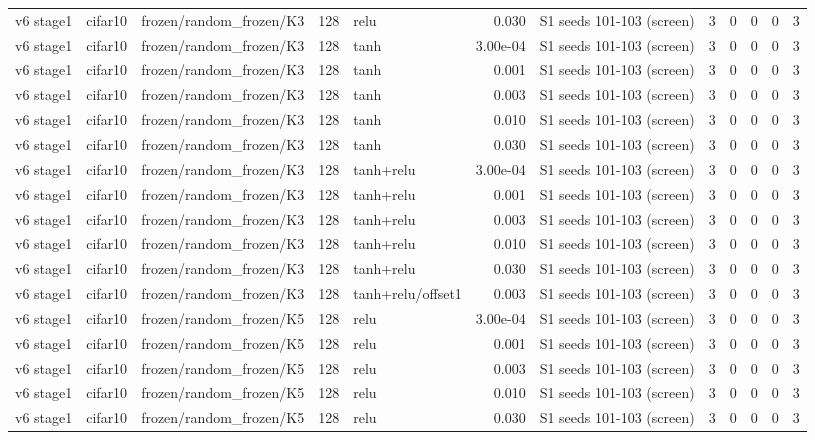 \begin{table}[htbp]
{\begin{tabular}{@{}lllrlrlrrrrr@{}}
v6 stage1 & cifar10 & frozen/random\_frozen/K3 & 128 & relu & 0.030 & S1 seeds 101-103 (screen) & 3 & 0 & 0 & 0 & 3 \\
v6 stage1 & cifar10 & frozen/random\_frozen/K3 & 128 & tanh & 3.00e-04 & S1 seeds 101-103 (screen) & 3 & 0 & 0 & 0 & 3 \\
v6 stage1 & cifar10 & frozen/random\_frozen/K3 & 128 & tanh & 0.001 & S1 seeds 101-103 (screen) & 3 & 0 & 0 & 0 & 3 \\
v6 stage1 & cifar10 & frozen/random\_frozen/K3 & 128 & tanh & 0.003 & S1 seeds 101-103 (screen) & 3 & 0 & 0 & 0 & 3 \\
v6 stage1 & cifar10 & frozen/random\_frozen/K3 & 128 & tanh & 0.010 & S1 seeds 101-103 (screen) & 3 & 0 & 0 & 0 & 3 \\
v6 stage1 & cifar10 & frozen/random\_frozen/K3 & 128 & tanh & 0.030 & S1 seeds 101-103 (screen) & 3 & 0 & 0 & 0 & 3 \\
v6 stage1 & cifar10 & frozen/random\_frozen/K3 & 128 & tanh+relu & 3.00e-04 & S1 seeds 101-103 (screen) & 3 & 0 & 0 & 0 & 3 \\
v6 stage1 & cifar10 & frozen/random\_frozen/K3 & 128 & tanh+relu & 0.001 & S1 seeds 101-103 (screen) & 3 & 0 & 0 & 0 & 3 \\
v6 stage1 & cifar10 & frozen/random\_frozen/K3 & 128 & tanh+relu & 0.003 & S1 seeds 101-103 (screen) & 3 & 0 & 0 & 0 & 3 \\
v6 stage1 & cifar10 & frozen/random\_frozen/K3 & 128 & tanh+relu & 0.010 & S1 seeds 101-103 (screen) & 3 & 0 & 0 & 0 & 3 \\
v6 stage1 & cifar10 & frozen/random\_frozen/K3 & 128 & tanh+relu & 0.030 & S1 seeds 101-103 (screen) & 3 & 0 & 0 & 0 & 3 \\
v6 stage1 & cifar10 & frozen/random\_frozen/K3 & 128 & tanh+relu/offset1 & 0.003 & S1 seeds 101-103 (screen) & 3 & 0 & 0 & 0 & 3 \\
v6 stage1 & cifar10 & frozen/random\_frozen/K5 & 128 & relu & 3.00e-04 & S1 seeds 101-103 (screen) & 3 & 0 & 0 & 0 & 3 \\
v6 stage1 & cifar10 & frozen/random\_frozen/K5 & 128 & relu & 0.001 & S1 seeds 101-103 (screen) & 3 & 0 & 0 & 0 & 3 \\
v6 stage1 & cifar10 & frozen/random\_frozen/K5 & 128 & relu & 0.003 & S1 seeds 101-103 (screen) & 3 & 0 & 0 & 0 & 3 \\
v6 stage1 & cifar10 & frozen/random\_frozen/K5 & 128 & relu & 0.010 & S1 seeds 101-103 (screen) & 3 & 0 & 0 & 0 & 3 \\
v6 stage1 & cifar10 & frozen/random\_frozen/K5 & 128 & relu & 0.030 & S1 seeds 101-103 (screen) & 3 & 0 & 0 & 0 & 3 \\

\end{tabular}}
\end{table}

